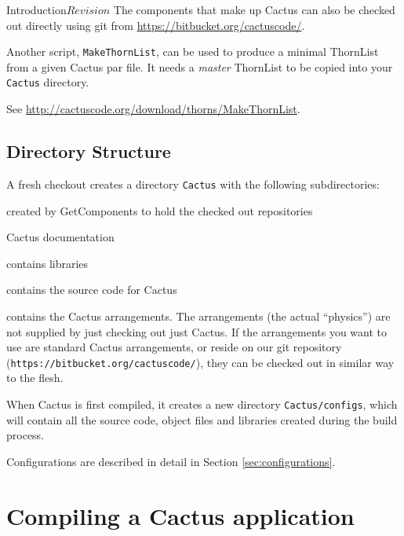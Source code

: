 \begin{cactuspart}{Introduction}{}{$Revision$}
The components that make up Cactus can also be checked out directly
using git from \url{https://bitbucket.org/cactuscode/}.

Another script, \texttt{MakeThornList}, can be used to produce a minimal
ThornList from a given Cactus par file.  It needs a \emph{master} ThornList
to be copied into your \texttt{Cactus} directory.

See \url{http://cactuscode.org/download/thorns/MakeThornList}.



\subsection{Directory Structure}
\label{sec:dist}

A fresh checkout creates a directory \texttt{Cactus} with the
following subdirectories:

\begin{Lentry}

\item[\texttt{repos}] created by GetComponents to hold the checked out
repositories

\item[\texttt{doc}] Cactus documentation

\item[\texttt{lib}] contains libraries

\item[\texttt{src}] contains the source code for Cactus

\item [\texttt{arrangements}] contains the Cactus arrangements. The arrangements
  (the actual ``physics'') are not supplied by just checking out just Cactus.
  If the arrangements you want to use are standard Cactus arrangements, or
  reside on our git repository (\texttt{https://bitbucket.org/cactuscode/}),
  they can be checked out in similar way to the flesh.
\end{Lentry}

When Cactus is first compiled, it creates a new directory
\texttt{Cactus/configs}, which will contain all the source code, object files
and libraries created during the build process.

Configurations are described in detail in Section \ref{sec:configurations}.


\section{Compiling a Cactus application}


\end{cactuspart}
